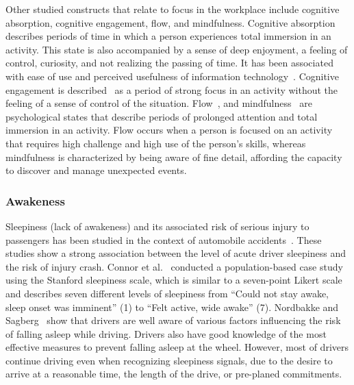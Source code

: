 Other studied constructs that relate to focus in the workplace include cognitive absorption, cognitive engagement, flow, and mindfulness.
Cognitive absorption describes periods of time in which a person experiences total immersion in an activity.
This state is also accompanied by a sense of deep enjoyment, a feeling of control, curiosity, and not realizing the passing of time.
It has been associated with ease of use and perceived usefulness of information technology~\cite{agarwal00}.
Cognitive engagement is described~\cite{webster97} as a period of strong focus in an activity without the feeling of a sense of control of the situation.
Flow~\cite{Csikszentmihalyi90}, and mindfulness~\cite{Weick06,dane11} are psychological states that describe periods of prolonged attention and total immersion in an activity. Flow occurs when a person is focused on an activity that requires high challenge and high use of the person's skills, whereas mindfulness is characterized by being aware of fine detail, affording the capacity to discover and manage unexpected events.

\subsubsection{Awakeness}

Sleepiness (lack of awakeness) and its associated risk of serious injury to passengers has been studied in the context of automobile 
accidents~\cite{connor02,Nordbakke07}.
These studies show a strong association between the level of acute driver sleepiness and the risk of injury crash.
Connor et al.~\cite{connor02} conducted a population-based case study using the Stanford sleepiness scale, which is similar to a seven-point Likert scale and describes seven different levels of sleepiness from ``Could not stay awake, sleep onset was imminent'' (1) to ``Felt active, wide awake'' (7).
Nordbakke and Sagberg~\cite{Nordbakke07} show that drivers are well aware of  various factors influencing the risk of falling asleep while driving. Drivers also have good knowledge of the most effective measures to prevent falling asleep at the wheel.
However, most of drivers continue driving even when recognizing sleepiness signals, due to the desire to arrive at a reasonable time, the length of the drive, or pre-planed commitments.


